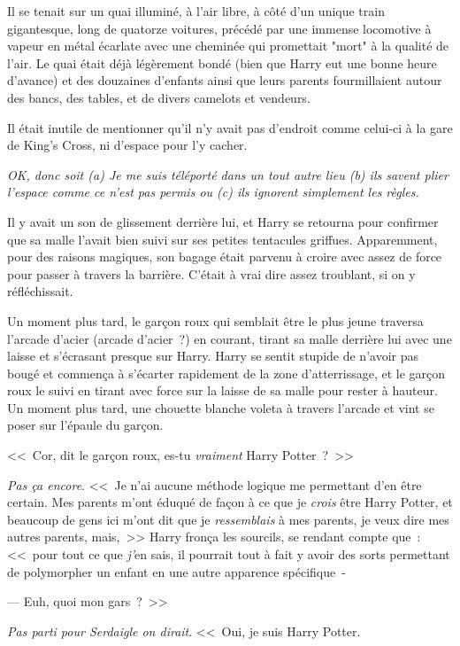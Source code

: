 Il se tenait sur un quai illuminé, à l'air libre, à côté d'un unique train gigantesque, long de quatorze voitures, précédé par une immense locomotive à vapeur en métal écarlate avec une cheminée qui promettait "mort" à la qualité de l'air. Le quai était déjà légèrement bondé (bien que Harry eut une bonne heure d'avance) et des douzaines d'enfants ainsi que leurs parents fourmillaient autour des bancs, des tables, et de divers camelots et vendeurs.

Il était inutile de mentionner qu'il n'y avait pas d'endroit comme celui-ci à la gare de King's Cross, ni d'espace pour l'y cacher.

\emph{OK, donc soit (a) Je me suis téléporté dans un tout autre lieu (b) ils savent plier l'espace comme ce n'est pas permis ou (c) ils ignorent simplement les règles.}

Il y avait un son de glissement derrière lui, et Harry se retourna pour confirmer que sa malle l'avait bien suivi sur ses petites tentacules griffues. Apparemment, pour des raisons magiques, son bagage était parvenu à croire avec assez de force pour passer à travers la barrière. C'était à vrai dire assez troublant, si on y réfléchissait.

Un moment plus tard, le garçon roux qui semblait être le plus jeune traversa l'arcade d'acier (arcade d'acier~?) en courant, tirant sa malle derrière lui avec une laisse et s'écrasant presque sur Harry. Harry se sentit stupide de n'avoir pas bougé et commença à s'écarter rapidement de la zone d'atterrissage, et le garçon roux le suivi en tirant avec force sur la laisse de sa malle pour rester à hauteur. Un moment plus tard, une chouette blanche voleta à travers l'arcade et vint se poser sur l'épaule du garçon.

<<~Cor, dit le garçon roux, es-tu \emph{vraiment} Harry Potter~?~>>

\emph{Pas ça encore}. <<~Je n'ai aucune méthode logique me permettant d'en être certain. Mes parents m'ont éduqué de façon à ce que je \emph{crois} être Harry Potter, et beaucoup de gens ici m'ont dit que je \emph{ressemblais} à mes parents, je veux dire mes autres parents, mais,~>> Harry fronça les sourcils, se rendant compte que~: <<~pour tout ce que \emph{j'}en sais, il pourrait tout à fait y avoir des sorts permettant de polymorpher un enfant en une autre apparence spécifique~-

--- Euh, quoi mon gars~?~>>

\emph{Pas parti pour Serdaigle on dirait}. <<~Oui, je suis Harry Potter.

